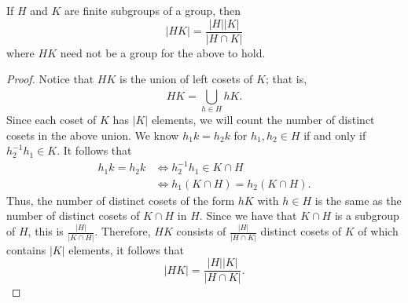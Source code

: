 \begin{theorem}
   If \( H  \) and \( K  \) are finite subgroups of a group, then 
   \[  | H K |  = \frac{ | H  |  | K  |  }{  |  H \cap K  |  } \]
   where \( HK  \) need not be a group for the above to hold.
\end{theorem}
\begin{proof}
Notice that \( HK \) is the union of left cosets of \( K  \); that is,  
\[  HK = \bigcup_{ h \in H  }^{  }  h K.  \]
Since each coset of \( K  \) has \( | K  |  \) elements, we will count the number of distinct cosets in the above union. We know \( {h}_{1} k = {h}_{2} k  \) for \( {h}_{1}, {h}_{2} \in H  \) if and only if \( {h}_{2}^{-1} {h}_{1} \in  K  \). It follows that   
\begin{align*}
    {h}_{1} k = {h}_{2} k &\iff {h}_{2}^{-1} {h}_{1} \in K \cap H  \\
                          &\iff {h}_{1} (K \cap H) = {h}_{2} (K \cap H).
\end{align*}
Thus, the number of distinct cosets of the form \( h K  \) with \( h \in H  \) is the same as the number of distinct cosets of \( K \cap H  \) in \( H  \). Since we have that \( K \cap H  \) is a subgroup of \( H  \), this is \( \frac{ | H  |   }{  | K \cap H  |  } \). Therefore, \( HK  \) consists of \( \frac{ | H  |   }{  | H \cap K  |  }  \) distinct cosets of \( K  \) of which contains \( | K  |  \) elements, it follows that 
\[  | HK  |  = \frac{ | H  | | K  |   }{  | H \cap K  |  }.  \]
\end{proof}

\begin{eg}
    
\end{eg}




